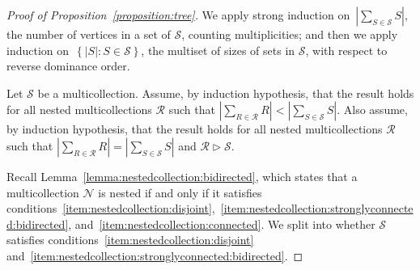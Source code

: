 \documentclass[11pt]{article}
\theoremstyle{definition}
\numberwithin{equation}{section}
\begin{document}
\begin{proof}[Proof of Proposition~\ref{proposition:tree}]
    We apply strong induction on~\(\left|\sum_{S \in \mathcal{S}} S\right|\), the number of vertices in a set of \(\mathcal{S}\), counting multiplicities;
    and then we apply induction on~\(\left\{|S| : S \in \mathcal{S}\right\}\), the multiset of sizes of sets in \(\mathcal{S}\), with respect to reverse dominance order.

    Let \(\mathcal{S}\) be a multicollection.
            Assume, by induction hypothesis, that the result holds for all nested multicollections \(\mathcal{R}\) such that \(\left|\sum_{R \in \mathcal{R}} R\right| < \left|\sum_{S \in \mathcal{S}} S\right|\).
    Also assume, by induction hypothesis, that the result holds for all nested multicollections \(\mathcal{R}\) such that \(\left|\sum_{R \in \mathcal{R}} R\right| = \left|\sum_{S \in \mathcal{S}} S\right|\) and \(\mathcal{R} \triangleright \mathcal{S}\).

                        Recall Lemma~\ref{lemma:nestedcollection:bidirected},
    which states that a multicollection \(\mathcal{N}\) is nested if and only if it satisfies conditions~\ref{item:nestedcollection:disjoint},~\ref{item:nestedcollection:stronglyconnected:bidirected}, and~\ref{item:nestedcollection:connected}.
    We split into whether \(\mathcal{S}\) satisfies conditions~\ref{item:nestedcollection:disjoint} and~\ref{item:nestedcollection:stronglyconnected:bidirected}.


\end{proof}
\end{document}

